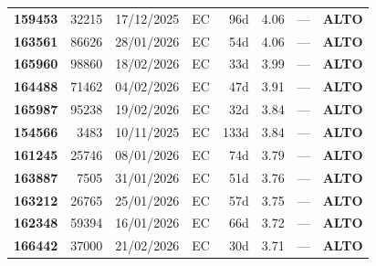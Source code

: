 \documentclass[a4paper,10pt]{article}
\begin{document}
\begin{center}
\begin{longtable}{>{\scriptsize}r>{\scriptsize}r>{\scriptsize}c>{\scriptsize}c>{\scriptsize}r>{\scriptsize}r>{\scriptsize}r>{\scriptsize}l}
\textcolor{anomorange}{\textbf{159453}} & 32215 & 17/12/2025 & \textcolor{anomorange}{EC} & 96d & \textcolor{anomorange}{4.06} & --- & \textcolor{anomorange}{\textbf{ALTO}} \\

\textcolor{anomorange}{\textbf{163561}} & 86626 & 28/01/2026 & \textcolor{anomorange}{EC} & 54d & \textcolor{anomorange}{4.06} & --- & \textcolor{anomorange}{\textbf{ALTO}} \\

\textcolor{anomorange}{\textbf{165960}} & 98860 & 18/02/2026 & \textcolor{anomorange}{EC} & 33d & \textcolor{anomorange}{3.99} & --- & \textcolor{anomorange}{\textbf{ALTO}} \\

\textcolor{anomorange}{\textbf{164488}} & 71462 & 04/02/2026 & \textcolor{anomorange}{EC} & 47d & \textcolor{anomorange}{3.91} & --- & \textcolor{anomorange}{\textbf{ALTO}} \\

\textcolor{anomorange}{\textbf{165987}} & 95238 & 19/02/2026 & \textcolor{anomorange}{EC} & 32d & \textcolor{anomorange}{3.84} & --- & \textcolor{anomorange}{\textbf{ALTO}} \\

\textcolor{anomorange}{\textbf{154566}} & 3483 & 10/11/2025 & \textcolor{anomorange}{EC} & 133d & \textcolor{anomorange}{3.84} & --- & \textcolor{anomorange}{\textbf{ALTO}} \\

\textcolor{anomorange}{\textbf{161245}} & 25746 & 08/01/2026 & \textcolor{anomorange}{EC} & 74d & \textcolor{anomorange}{3.79} & --- & \textcolor{anomorange}{\textbf{ALTO}} \\

\textcolor{anomorange}{\textbf{163887}} & 7505 & 31/01/2026 & \textcolor{anomorange}{EC} & 51d & \textcolor{anomorange}{3.76} & --- & \textcolor{anomorange}{\textbf{ALTO}} \\

\textcolor{anomorange}{\textbf{163212}} & 26765 & 25/01/2026 & \textcolor{anomorange}{EC} & 57d & \textcolor{anomorange}{3.75} & --- & \textcolor{anomorange}{\textbf{ALTO}} \\

\textcolor{anomorange}{\textbf{162348}} & 59394 & 16/01/2026 & \textcolor{anomorange}{EC} & 66d & \textcolor{anomorange}{3.72} & --- & \textcolor{anomorange}{\textbf{ALTO}} \\

\textcolor{anomorange}{\textbf{166442}} & 37000 & 21/02/2026 & \textcolor{anomorange}{EC} & 30d & \textcolor{anomorange}{3.71} & --- & \textcolor{anomorange}{\textbf{ALTO}} \\


\end{longtable}
\end{center}
\end{document}
